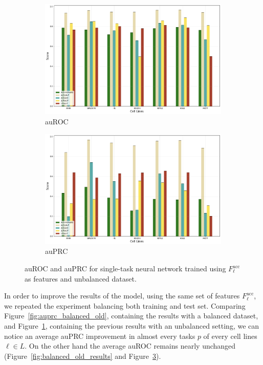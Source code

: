 \begin{figure}[!htbp]
    \centering
    \begin{subfigure}[b]{\textwidth}
        \includegraphics[width=\textwidth]{images/results_plots/single_tasks/unbalanced_old_auroc.png}
        \caption{auROC}
        \label{fig:auroc_unbalanced_old}
    \end{subfigure}
    \begin{subfigure}[b]{\textwidth}
        \includegraphics[width=\textwidth]{images/results_plots/single_tasks/unbalanced_old_auprc.png}
        \caption{auPRC}
        \label{fig:auprc_unbalanced_old}
    \end{subfigure}
    \caption{auROC and auPRC for single-task neural network trained using $F_\ell^{\textrm{acc}}$ as features and unbalanced dataset.}\label{fig:unbalanced_old_results}
\end{figure}

In order to improve the results of the model, using the same set of features $F_\ell^{\textrm{acc}}$, we repeated the experiment balancing both training and test set. Comparing Figure~\ref{fig:auprc_balanced_old}, containing the results with a balanced dataset, and Figure~\ref{fig:auroc_unbalanced_old}, containing the previous results with an unbalanced setting, we can notice an average auPRC improvement in almost every tasks $p$ of every cell lines $\ell \in L$. On the other hand the average auROC remains nearly unchanged (Figure~\ref{fig:balanced_old_results} and Figure~\ref{fig:unbalanced_old_results}). 

